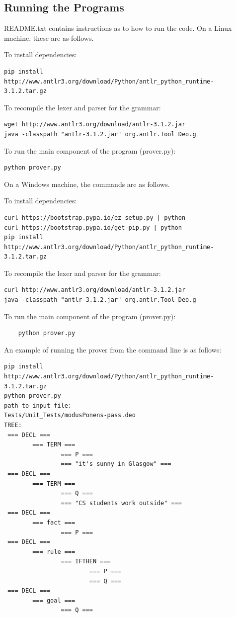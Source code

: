 \documentclass{l4proj}
\begin{document}
\begin{appendices}
\chapter{Running the Programs}
README.txt contains instructions as to how to run the code. On a Linux machine, these are as follows. 

To install dependencies: 
\begin{verbatim}
pip install http://www.antlr3.org/download/Python/antlr_python_runtime-3.1.2.tar.gz
\end{verbatim}
To recompile the lexer and parser for the grammar: 
\begin{verbatim}
wget http://www.antlr3.org/download/antlr-3.1.2.jar
java -classpath "antlr-3.1.2.jar" org.antlr.Tool Deo.g
\end{verbatim}
To run the main component of the program (prover.py): 
\begin{verbatim}
python prover.py
\end{verbatim}

On a Windows machine, the commands are as follows. 

To install dependencies: 
\begin{verbatim}
curl https://bootstrap.pypa.io/ez_setup.py | python
curl https://bootstrap.pypa.io/get-pip.py | python
pip install http://www.antlr3.org/download/Python/antlr_python_runtime-3.1.2.tar.gz
\end{verbatim}

To recompile the lexer and parser for the grammar: 
\begin{verbatim}
curl http://www.antlr3.org/download/antlr-3.1.2.jar
java -classpath "antlr-3.1.2.jar" org.antlr.Tool Deo.g
\end{verbatim}

To run the main component of the program (prover.py): 
\begin{verbatim}
	python prover.py
\end{verbatim}

An example of running the prover from the command line is as follows:
\begin{verbatim}
pip install http://www.antlr3.org/download/Python/antlr_python_runtime-3.1.2.tar.gz
python prover.py
path to input file:
Tests/Unit_Tests/modusPonens-pass.deo
TREE: 
 === DECL ===
        === TERM ===
                === P ===
                === "it's sunny in Glasgow" ===
 === DECL ===
        === TERM ===
                === Q ===
                === "CS students work outside" ===
 === DECL ===
        === fact ===
                === P ===
 === DECL ===
        === rule ===
                === IFTHEN ===
                        === P ===
                        === Q ===
 === DECL ===
        === goal ===
                === Q ===


\end{verbatim}
\end{appendices}
\end{document}
